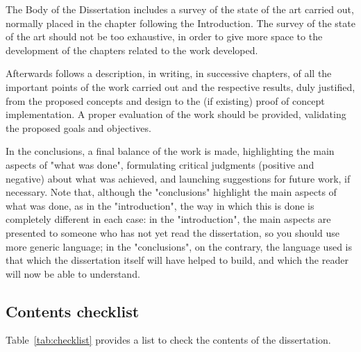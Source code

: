 The Body of the Dissertation includes a survey of the state of the art carried out, normally placed in the chapter following the Introduction. The survey of the state of the art should not be too exhaustive, in order to give more space to the development of the chapters related to the work developed.

Afterwards follows a description, in writing, in successive chapters, of all the important points of the work carried out and the respective results, duly justified, from the proposed concepts and design to the (if existing) proof of concept implementation. A proper evaluation of the work should be provided, validating the proposed goals and objectives.

In the conclusions, a final balance of the work is made, highlighting the main aspects of "what was done", formulating critical judgments (positive and negative) about what was achieved, and launching suggestions for future work, if necessary. Note that, although the "conclusions" highlight the main aspects of what was done, as in the "introduction", the way in which this is done is completely different in each case: in the "introduction", the main aspects are presented to someone who has not yet read the dissertation, so you should use more generic language; in the "conclusions", on the contrary, the language used is that which the dissertation itself will have helped to build, and which the reader will now be able to understand.

\subsection{Contents checklist}

Table~\ref{tab:checklist} provides a list to check the contents of the dissertation. 

